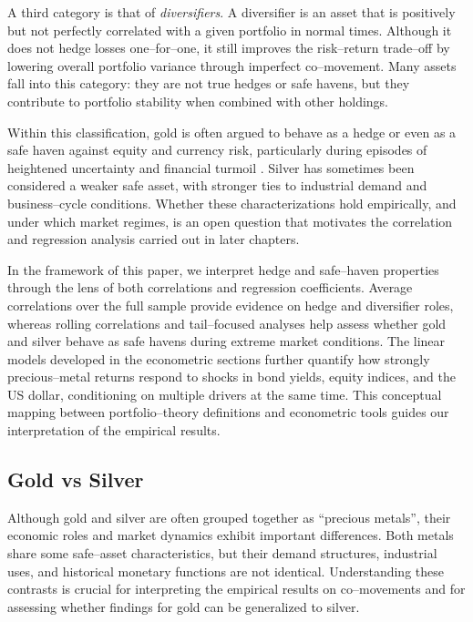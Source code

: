A third category is that of \emph{diversifiers}. A diversifier is an asset that is
positively but not perfectly correlated with a given portfolio in normal times. Although
it does not hedge losses one–for–one, it still improves the risk–return trade–off by
lowering overall portfolio variance through imperfect co–movement. Many assets fall into
this category: they are not true hedges or safe havens, but they contribute to portfolio
stability when combined with other holdings.

Within this classification, gold is often argued to behave as a hedge or even as a safe
haven against equity and currency risk, particularly during episodes of heightened
uncertainty and financial turmoil . Silver has sometimes
been considered a weaker safe asset, with stronger ties to industrial demand and
business–cycle conditions. Whether these characterizations hold empirically, and under
which market regimes, is an open question that motivates the correlation and regression
analysis carried out in later chapters.

In the framework of this paper, we interpret hedge and safe–haven properties through the
lens of both correlations and regression coefficients. Average correlations over the full
sample provide evidence on hedge and diversifier roles, whereas rolling correlations and
tail–focused analyses help assess whether gold and silver behave as safe havens during
extreme market conditions. The linear models developed in the econometric sections further
quantify how strongly precious–metal returns respond to shocks in bond yields, equity
indices, and the US dollar, conditioning on multiple drivers at the same time. This
conceptual mapping between portfolio–theory definitions and econometric tools guides our
interpretation of the empirical results.
\subsection{Gold vs Silver}

Although gold and silver are often grouped together as ``precious metals'', their economic
roles and market dynamics exhibit important differences. Both metals share some safe–asset
characteristics, but their demand structures, industrial uses, and historical monetary
functions are not identical. Understanding these contrasts is crucial for interpreting the
empirical results on co–movements and for assessing whether findings for gold can be
generalized to silver.

